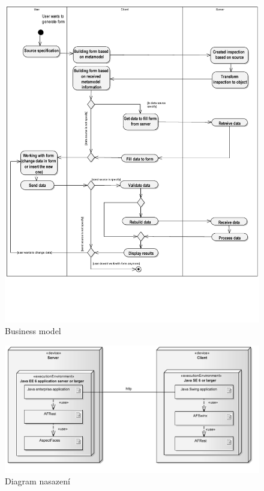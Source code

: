 \documentclass[11pt,twoside,a4paper]{book}
\begin{document}
\begin{figure}
\includegraphics{images/businessModel}
\caption{Business model}
\label{img:businessModel}
\end{figure}

\begin{figure}
\begin{center}
\includegraphics{images/deploymentDiagram}
\caption{Diagram nasazení}
\label{img:deploymentFrameworkDiagram}
\end{center}
\end{figure}
\end{document}
